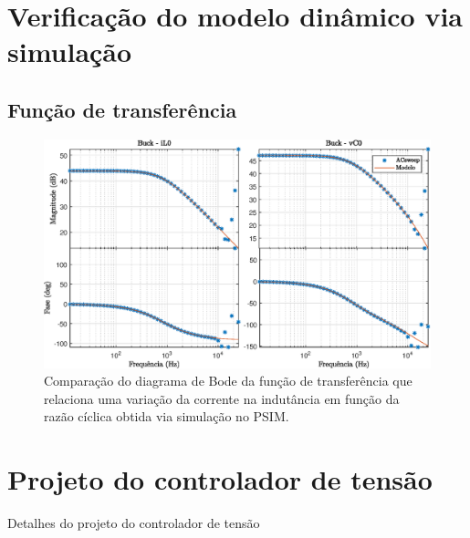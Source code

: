 \section{Verificação do modelo dinâmico via simulação}

\subsection{Função de transferência}


\begin{figure}[!ht]
	\centering
	\includegraphics[width=1\linewidth]{Figs/Buck-ValidacaoModelo}
	\caption{Comparação do diagrama de Bode da função de transferência que relaciona uma variação da corrente na indutância em função da razão cíclica obtida via simulação no PSIM.}
	\label{fig:buck-il0}
\end{figure}


\section{Projeto do controlador de tensão}
Detalhes do projeto do controlador de tensão


